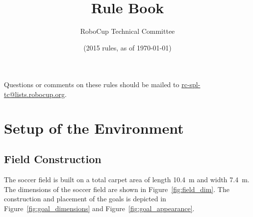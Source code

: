 \documentclass[12pt]{article}
\title{\leaguename Rule Book}
\author{RoboCup Technical Committee}
\date{(2015 rules, as of \today)}
\newcommand{\TotalWidth}{7.4~m\xspace}
\newcommand{\TotalLength}{10.4~m\xspace }
\begin{document}
\maketitle

\begin{center}
Questions or comments on these rules should be mailed to \url{rc-spl-tc@lists.robocup.org}.
\end{center}

\vfill

\tableofcontents
\setcounter{tocdepth}{3}

\thispagestyle{fancy}

\clearpage

\cfoot{\thepage}
\setcounter{page}{1}

\section{Setup of the Environment}

\subsection{Field Construction}
\label{sec:field_dim}

The soccer field is built on a total carpet area of length \TotalLength and width \TotalWidth. The dimensions of the soccer field are shown in Figure~\ref{fig:field_dim}. The construction and placement of the goals is depicted in Figure~\ref{fig:goal_dimensions} and Figure~\ref{fig:goal_appearance}.
\end{document}
